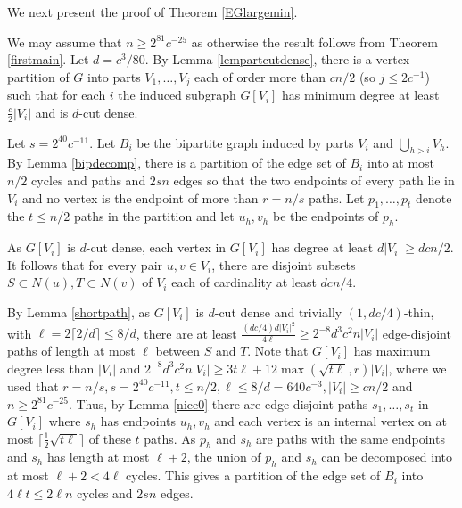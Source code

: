 \documentclass[11pt]{article}
\begin{document}
We next present the proof of Theorem \ref{EGlargemin}.

\vspace{2mm}

 We may assume that $n \geq 2^{81}c^{-25}$ as otherwise the result follows from Theorem \ref{firstmain}. Let $d=c^3/80$. By Lemma \ref{lempartcutdense}, there is a vertex partition of $G$ into parts $V_1,\ldots,V_j$ each of order more than $cn/2$ (so $j \leq 2c^{-1} $) such that for each $i$ the induced subgraph $G[V_i]$ has minimum degree at least $\frac{c}{2}|V_i|$ and is $d$-cut dense.

Let $s=2^{40}c^{-11}$.  Let $B_i$ be the bipartite graph induced by parts $V_i$ and $\bigcup_{h>i} V_h$. By Lemma \ref{bipdecomp}, there is a partition of the edge set of $B_i$ into at most $n/2$ cycles and paths and $2sn$ edges so that the two endpoints of every path lie in $V_i$ and no vertex is the endpoint of more than $r=n/s$ paths. Let $p_1,\ldots,p_t$ denote the $t \leq n/2$ paths in the partition and let $u_h,v_h$ be the endpoints of $p_h$.

As $G[V_i]$ is $d$-cut dense, each vertex in $G[V_i]$ has degree at least $d|V_i| \geq dcn/2$. It follows that for every pair $u,v \in V_i$, there are disjoint subsets $S \subset N(u), T \subset N(v)$ of $V_i$ each of cardinality at least $dcn/4$.


By Lemma \ref{shortpath}, as $G[V_i]$ is $d$-cut dense and trivially $(1,dc/4)$-thin, with $\ell=2 \lceil 2/d \rceil \leq 8/d$, there are at least $\frac{(dc/4)d|V_i|^2}{4\ell} \geq 2^{-8}d^3c^2n|V_i|$ edge-disjoint paths of length at most $\ell$  between $S$ and $T$. 
Note that $G[V_i]$ has maximum degree less than $|V_i|$ and
$2^{-8}d^3c^2n|V_i| \geq 3t\ell+12\max\left(\sqrt{t\ell},r\right)|V_i|$, where we used that 
$r=n/s, s=2^{40}c^{-11}, t \leq n/2, \ell \leq 8/d=640c^{-3}, |V_i|\geq cn/2$ and $n \geq 2^{81}c^{-25}$.
Thus, by Lemma \ref{nice0}
there are edge-disjoint paths $s_1,\ldots,s_t$ in $G[V_i]$ where $s_h$ has endpoints $u_h,v_h$ and each vertex is an internal vertex on at most $\lceil \frac{1}{2}\sqrt{t \ell} \rceil$ of these $t$ paths. As $p_h$ and $s_h$ are paths with the same endpoints and $s_h$ has length at most $\ell + 2$, the union of $p_h$ and $s_h$  can be decomposed into at most $\ell+ 2 < 4 \ell$ cycles. This gives a partition of the edge set of $B_i$ into $4\ell t \leq 2\ell n$ cycles and $2sn$ edges.
\end{document}
